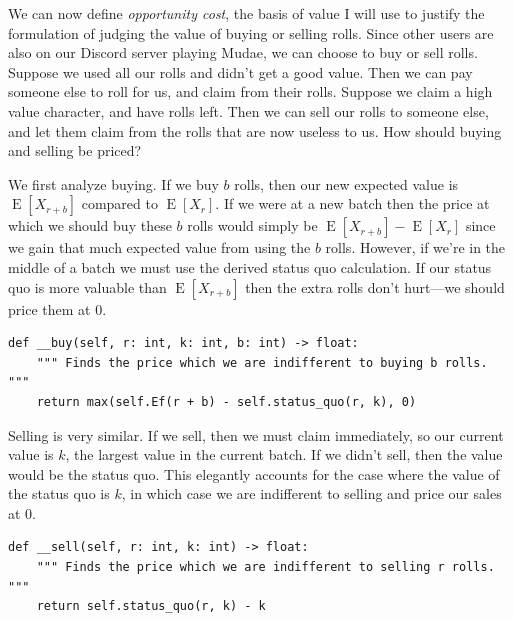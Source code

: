 \documentclass[11pt, oneside]{article}
\DeclareMathOperator{\E}{E}
\theoremstyle{plain}
\theoremstyle{definition}
\begin{document}
We can now define \textit{opportunity cost}, the basis of value I will use to
justify the formulation of judging the value of buying or selling rolls. Since
other users are also on our Discord server playing Mudae, we can choose to buy
or sell rolls. Suppose we used all our rolls and didn't get a good value. Then
we can pay someone else to roll for us, and claim from their rolls. Suppose we
claim a high value character, and have rolls left. Then we can sell our rolls
to someone else, and let them claim from the rolls that are now useless to us.
How should buying and selling be priced?

We first analyze buying. If we buy \( b \) rolls, then our new expected value
is \( \E[X_{r + b}] \) compared to \( \E[X_r] \). If we were at a new batch
then the price at which we should buy these \( b \) rolls would simply be \(
\E[X_{r + b}] - \E[X_r] \) since we gain that much expected value from using
the \( b \) rolls. However, if we're in the middle of a batch we must use the
derived status quo calculation. If our status quo is more valuable than \(
\E[X_{r + b}] \) then the extra rolls don't hurt---we should price them at 0.
\begin{verbatim}
def __buy(self, r: int, k: int, b: int) -> float:
    """ Finds the price which we are indifferent to buying b rolls. """
    return max(self.Ef(r + b) - self.status_quo(r, k), 0)
\end{verbatim}

Selling is very similar. If we sell, then we must claim immediately, so our
current value is \( k \), the largest value in the current batch. If we didn't
sell, then the value would be the status quo. This elegantly accounts for
the case where the value of the status quo is \( k \), in which case we are
indifferent to selling and price our sales at \( 0 \).
\begin{verbatim}
def __sell(self, r: int, k: int) -> float:
    """ Finds the price which we are indifferent to selling r rolls. """
    return self.status_quo(r, k) - k
\end{verbatim}
\end{document}
